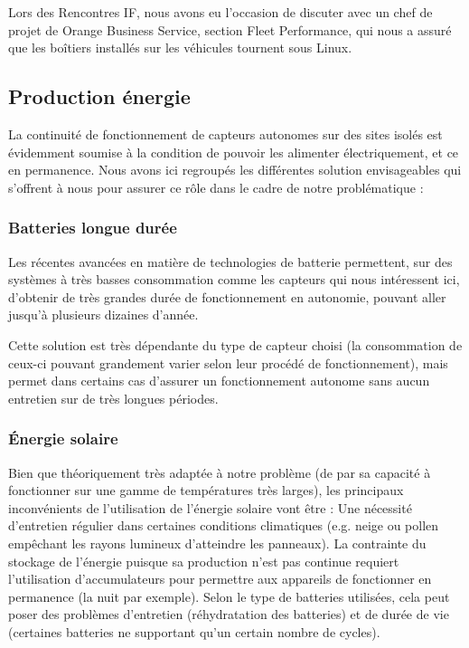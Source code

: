 Lors des Rencontres IF, nous avons eu l’occasion de discuter avec un chef de projet de Orange Business Service, section Fleet Performance, qui nous a assuré que les boîtiers installés sur les véhicules tournent sous Linux.

\subsection{Production énergie}

La continuité de fonctionnement de capteurs autonomes sur des sites isolés est évidemment soumise à la condition de pouvoir les alimenter électriquement, et ce en permanence. Nous avons ici regroupés les différentes solution envisageables qui s’offrent à nous pour assurer ce rôle dans le cadre de notre problématique :

\subsubsection{Batteries longue durée}

Les récentes avancées en matière de technologies de batterie permettent, sur des systèmes à très basses consommation comme les capteurs qui nous intéressent ici, d’obtenir de très grandes durée de fonctionnement en autonomie, pouvant aller jusqu’à plusieurs dizaines d’année.

Cette solution est très dépendante du type de capteur choisi (la consommation de ceux-ci pouvant grandement varier selon leur procédé de fonctionnement), mais permet dans certains cas d’assurer un fonctionnement autonome sans aucun entretien sur de très longues périodes.

\subsubsection{Énergie solaire}

Bien que théoriquement très adaptée à notre problème (de par sa capacité à fonctionner sur une gamme de températures très larges), les principaux inconvénients de l’utilisation de l’énergie solaire vont être :
Une nécessité d’entretien régulier dans certaines conditions climatiques (e.g. neige ou pollen empêchant les rayons lumineux d’atteindre les panneaux).
La contrainte du stockage de l’énergie puisque sa production n’est pas continue requiert l’utilisation d’accumulateurs pour permettre aux appareils de fonctionner en permanence (la nuit par exemple). Selon le type de batteries utilisées, cela peut poser des problèmes d’entretien (réhydratation des batteries) et de durée de vie (certaines batteries ne supportant qu’un certain nombre de cycles).

